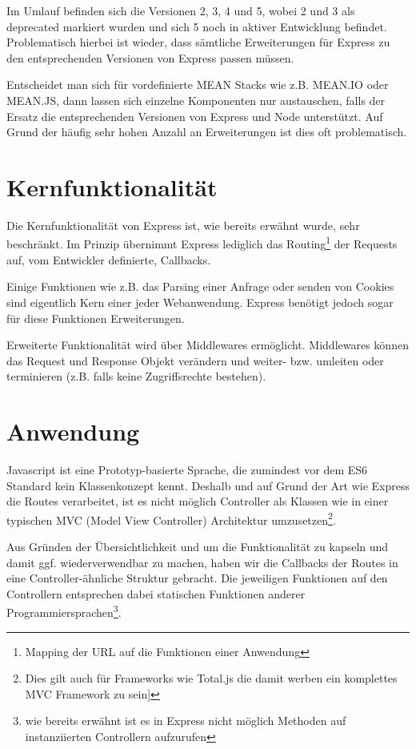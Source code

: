 Im Umlauf befinden sich die Versionen 2, 3, 4 und 5, wobei 2 und 3 als
deprecated markiert wurden und sich 5 noch in aktiver Entwicklung
befindet. Problematisch hierbei ist wieder, dass sämtliche Erweiterungen
für Express zu den entsprechenden Versionen von Express passen müssen.

Entscheidet man sich für vordefinierte MEAN Stacks wie z.B. MEAN.IO oder
MEAN.JS, dann lassen sich einzelne Komponenten nur austauschen, falls
der Ersatz die entsprechenden Versionen von Express und Node
unterstützt. Auf Grund der häufig sehr hohen Anzahl an Erweiterungen ist
dies oft problematisch.

\section{Kernfunktionalität}\label{kernfunktionalituxe4t}

Die Kernfunktionalität von Express ist, wie bereits erwähnt wurde, sehr
beschränkt. Im Prinzip übernimmt Express lediglich das Routing\footnote{Mapping der URL auf die Funktionen einer Anwendung} der Requests auf, vom Entwickler definierte, Callbacks.

Einige Funktionen wie z.B. das Parsing einer Anfrage oder senden von Cookies
sind eigentlich Kern einer jeder Webanwendung. Express benötigt jedoch sogar für
diese Funktionen Erweiterungen.

Erweiterte Funktionalität wird über Middlewares ermöglicht. Middlewares
können das Request und Response Objekt verändern und weiter- bzw.
umleiten oder terminieren (z.B. falls keine Zugriffsrechte bestehen).

\section{Anwendung}\label{anwendung}

Javascript ist eine Prototyp-basierte Sprache, die zumindest vor dem
ES6 Standard kein Klassenkonzept kennt. Deshalb und auf Grund der Art wie Express
die Routes verarbeitet, ist es nicht möglich Controller als Klassen wie
in einer typischen MVC (Model View Controller) Architektur umzusetzen\footnote{Dies gilt auch für Frameworks wie Total.js die damit werben ein komplettes MVC Framework zu sein]}.

Aus Gründen der Übersichtlichkeit und um die Funktionalität zu kapseln
und damit ggf. wiederverwendbar zu machen, haben wir die Callbacks der Routes in
eine Controller-ähnliche Struktur gebracht. Die jeweiligen Funktionen
auf den Controllern entsprechen dabei statischen Funktionen anderer
Programmiersprachen\footnote{wie bereits erwähnt ist es in Express nicht möglich
Methoden auf instanziierten Controllern aufzurufen}.


